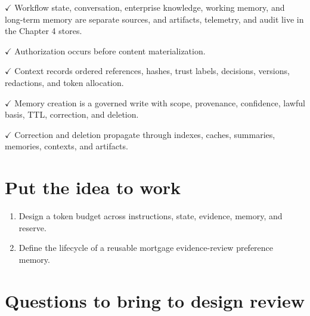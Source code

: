 \textbf{\ensuremath{\checkmark}} Workflow state, conversation, enterprise knowledge, working memory, and long-term memory are separate sources, and artifacts, telemetry, and audit live in the Chapter 4 stores.\par

\textbf{\ensuremath{\checkmark}} Authorization occurs before content materialization.\par

\textbf{\ensuremath{\checkmark}} Context records ordered references, hashes, trust labels, decisions, versions, redactions, and token allocation.\par

\textbf{\ensuremath{\checkmark}} Memory creation is a governed write with scope, provenance, confidence, lawful basis, TTL, correction, and deletion.\par

\textbf{\ensuremath{\checkmark}} Correction and deletion propagate through indexes, caches, summaries, memories, contexts, and artifacts.\par

\section{Put the idea to work}

\begin{enumerate}

\item Design a token budget across instructions, state, evidence, memory, and reserve.

\item Define the lifecycle of a reusable mortgage evidence-review preference memory.

\end{enumerate}

\section{Questions to bring to design review}

